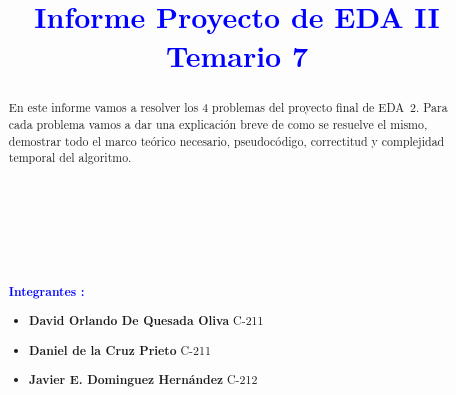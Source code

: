\documentclass{article}
\begin{document}
    \title{\textcolor{blue}{\textbf{Informe Proyecto de EDA II \\Temario 7}}\\}
    
    \date{} 
    \maketitle  

    \begin{abstract}
        \noindent En este informe  vamos a resolver los 4 problemas del proyecto final de 
        EDA~2. Para cada problema vamos a dar  una explicaci\'on breve de como se resuelve el mismo, demostrar todo el marco te\'orico necesario, 
        pseudoc\'odigo, correctitud y complejidad temporal del algoritmo.\\\\
        \\\\
        \\\\
        \\\\
        {\large{ \textcolor{blue}{\textbf{Integrantes :}}}}
        \begin{itemize}
            \item \textbf{David Orlando De Quesada Oliva}  C-211
            \item \textbf{Daniel de la Cruz Prieto} C-211
            \item \textbf{Javier E. Dominguez Hern\'andez} C-212
        \end{itemize}
       
    \end{abstract}
\end{document}
